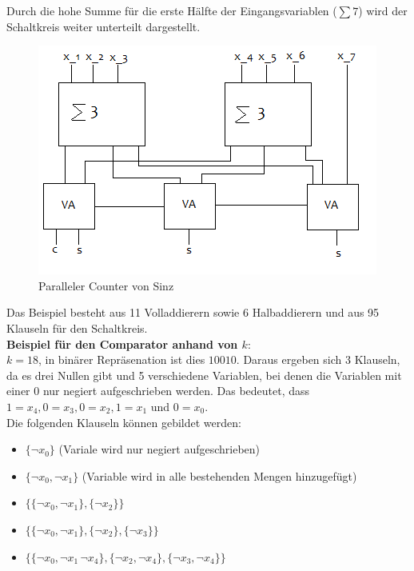 \documentclass[a4,abstract=on]{scrartcl}
\begin{document}
Durch die hohe Summe für die erste Hälfte der Eingangsvariablen ($\sum7$) wird der Schaltkreis weiter unterteilt dargestellt.

\begin{figure}[H]
\centering
\includegraphics[width=\textwidth]{Bsp_Sinz_fein.png}
\caption{Paralleler Counter von Sinz}
\label{fig:sinz_counter_para_bsp}
\end{figure}

Das Beispiel besteht aus 11 Volladdierern sowie 6 Halbaddierern und aus 95 Klauseln für den Schaltkreis.\\

\textbf{Beispiel für den Comparator anhand von $k$}:\\
$k = 18$, in binärer Repräsenation ist dies $10010$. Daraus ergeben sich 3 Klauseln, da es drei Nullen gibt und 5 verschiedene Variablen, bei denen die Variablen mit einer $0$ nur negiert aufgeschrieben werden. Das bedeutet, dass $1=x_4, 0=x_3, 0=x_2, 1=x_1$ und $0=x_0$.\\
Die folgenden Klauseln können gebildet werden:\\
\begin{itemize}
\item $\{\neg x_0\}$ (Variale wird nur negiert aufgeschrieben)
\item  $\{\neg x_0,\neg x_1\}$ (Variable wird in alle bestehenden Mengen hinzugefügt)
\item $\{\{\neg x_0, \neg x_1\},\{\neg x_2\}\}$
\item $\{\{\neg x_0, \neg x_1\},\{\neg x_2\}, \{\neg x_3\}\}$
\item $\{\{\neg x_0, \neg x_1\, \neg x_4\},\{\neg x_2, \neg x_4\}, \{\neg x_3, \neg x_4\}\}$
\end{itemize}
\end{document}
